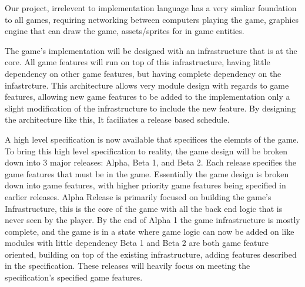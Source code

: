 
\begin{comment}

  - what is infrastructure
  - why infrastructure is soo important
    - it is the skelenton of the program
    - once infrastructure is in place, it defines what is easy to change, and what can't change without major refactor


\end{comment}


Our project, irrelevent to implementation language has a very simliar foundation to all games, requiring networking between computers playing the game, graphics engine that can draw the game, assets/sprites for in game entities.

The game's implementation will be designed with an infrastructure that is at the core. All game features will run on top of this infrastructure, having little dependency on other game features, but having complete dependency on the infastrcture. This architecture allows very module design with regards to game features, allowing new game features to be added to the implementation only a slight modification of the infrastructure to include the new feature. By designing the architecture like this, It faciliates a release based schedule.

A high level specification is now available that specifices the elemnts of the game. To bring this high level specification to reality, the game design will be broken down into 3 major releases: Alpha, Beta 1, and Beta 2. Each release specifies the game features that must be in the game. Essentially the game design is broken down into game features, with higher priority game features being specified in earlier releases.
Alpha Release is primarily focused on building the game's Infrastructure, this is the core of the game with all the back end logic that is never seen by the player. By the end of Alpha 1 the game infrastructure is mostly complete, and the game is in a state where game logic can now be added on like modules with little dependency 
Beta 1 and Beta 2 are both game feature oriented, building on top of the existing infrastructure, adding features described in the specification. These releases will heavily focus on meeting the specification's specified game features. 